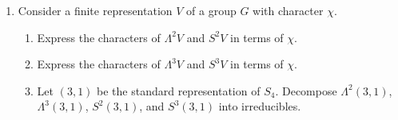 \documentclass[../psets.tex]{subfiles}
\begin{document}
\begin{enumerate}
\begin{enumerate}
    \end{enumerate}
    \item Consider a finite representation $V$ of a group $G$ with character $\chi$.
    \begin{enumerate}
        \item Express the characters of $\Lambda^2V$ and $S^2V$ in terms of $\chi$.
        \item Express the characters of $\Lambda^3V$ and $S^3V$ in terms of $\chi$.
        \item Let $(3,1)$ be the standard representation of $S_4$. Decompose $\Lambda^2(3,1)$, $\Lambda^3(3,1)$, $S^2(3,1)$, and $S^3(3,1)$ into irreducibles.
    \end{enumerate}
\end{enumerate}
\end{document}
